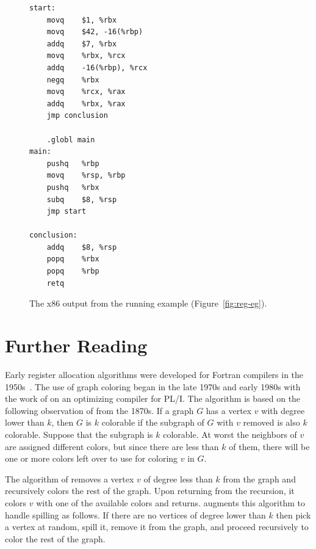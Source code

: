 \documentclass[11pt]{book}
\begin{document}
  
\begin{figure}[tbp]
\begin{lstlisting}
start:
	movq	$1, %rbx
	movq	$42, -16(%rbp)
	addq	$7, %rbx
	movq	%rbx, %rcx
	addq	-16(%rbp), %rcx
	negq	%rbx
	movq	%rcx, %rax
	addq	%rbx, %rax
	jmp conclusion

	.globl main
main:
	pushq	%rbp
	movq	%rsp, %rbp
	pushq	%rbx
	subq	$8, %rsp
	jmp start
        
conclusion:
	addq	$8, %rsp
	popq	%rbx
	popq	%rbp
	retq
\end{lstlisting}
\caption{The x86 output from the running example (Figure~\ref{fig:reg-eg}).}
\label{fig:running-example-x86}
\end{figure}




\section{Further Reading}
\label{sec:register-allocation-further-reading}

Early register allocation algorithms were developed for Fortran
compilers in the 1950s~\citep{Horwitz:1966aa,Backus:1978aa}.  The use
of graph coloring began in the late 1970s and early 1980s with the
work of \citet{Chaitin:1981vl} on an optimizing compiler for PL/I. The
algorithm is based on the following observation of
\citet{Kempe:1879aa} from the 1870s.  If a graph $G$ has a vertex $v$
with degree lower than $k$, then $G$ is $k$ colorable if the subgraph
of $G$ with $v$ removed is also $k$ colorable. Suppose that the
subgraph is $k$ colorable.  At worst the neighbors of $v$ are assigned
different colors, but since there are less than $k$ of them, there
will be one or more colors left over to use for coloring $v$ in $G$.

The algorithm of \citet{Chaitin:1981vl} removes a vertex $v$ of degree
less than $k$ from the graph and recursively colors the rest of the
graph. Upon returning from the recursion, it colors $v$ with one of
the available colors and returns.  \citet{Chaitin:1982vn} augments
this algorithm to handle spilling as follows. If there are no vertices
of degree lower than $k$ then pick a vertex at random, spill it,
remove it from the graph, and proceed recursively to color the rest of
the graph.
\end{document}
